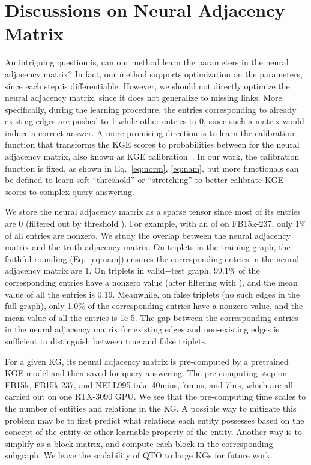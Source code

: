 \section{Discussions on Neural Adjacency Matrix}
\label{app:discussion}
An intriguing question is, can our method learn the parameters in the neural adjacency matrix?
In fact, our method supports optimization on the parameters, since each step is differentiable.
However, we should not directly optimize the neural adjacency matrix, since it does not generalize to missing links.
More specifically, during the learning procedure, the entries corresponding to already existing edges are pushed to 1 while other entries to 0, since such a matrix would induce a correct answer.
A more promising direction is to learn the calibration function that transforms the KGE scores to probabilities between  for the neural adjacency matrix, also known as KGE calibration~\cite{safavi2020evaluating}.
In our work, the calibration function is fixed, as shown in Eq.~\ref{eq:norm}, \ref{eq:nam}, but more functionals can be defined to learn soft ``threshold'' or ``stretching'' to better calibrate KGE scores to complex query answering.

We store the  neural adjacency matrix as a sparse tensor since most of its entries are 0 (filtered out by threshold ). For example, with an  of  on FB15k-237, only 1\% of all entries are nonzero. We study the overlap between the neural adjacency matrix and the truth adjacency matrix. On triplets in the training graph, the faithful rounding (Eq.~\ref{eq:nam}) ensures the corresponding entries in the neural adjacency matrix are 1. On triplets in valid+test graph, 99.1\% of the corresponding entries have a nonzero value (after filtering with ), and the mean value of all the entries is 0.19. Meanwhile, on false triplets (no such edges in the full graph), only 1.0\% of the corresponding entries have a nonzero value, and the mean value of all the entries is 1e-5. The gap between the corresponding entries in the neural adjacency matrix for existing edges and non-existing edges is sufficient to distinguish between true and false triplets.

For a given KG, its neural adjacency matrix  is pre-computed by a pretrained KGE model and then saved for query answering.
The pre-computing step on FB15k, FB15k-237, and NELL995 take 40mins, 7mins, and 7hrs, which are all carried out on one RTX-3090 GPU.
We see that the pre-computing time scales to the number of entities and relations in the KG.
A possible way to mitigate this problem may be to first predict what relations each entity possesses based on the concept of the entity or other learnable property of the entity.
Another way is to simplify  as a block matrix, and compute each block in the corresponding subgraph.
We leave the scalability of QTO to large KGs for future work.

